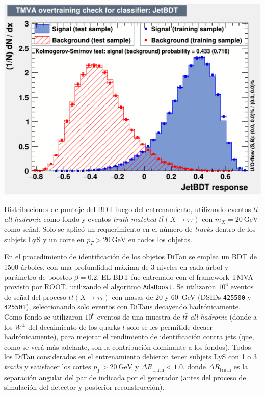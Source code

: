 \begin{marginfigure}[-18em]
    \includegraphics[width=0.99\linewidth]{Assets/Plots/DiTau/ID/TMVA.png}
    \caption{Distribuciones de puntaje del BDT luego del entrenamiento, utilizando eventos $t\bar{t}$ \textit{all-hadronic} como fondo y eventos \textit{truth-matched} $t\bar{t}(X \to \tau\tau)$ con $m_X = \SI{20}{\GeV}$ como señal. Solo se aplicó un requerimiento en el número de \textit{tracks} dentro de los subjets LyS y un corte en $p_T > \SI{20}{\GeV}$ en todos los objetos.}
    \label{fig:ch3:ditau:bdt_output}
\end{marginfigure}

En el procedimiento de identificación de los objetos DiTau se emplea un BDT de 1500 árboles, con una profundidad máxima de 3 niveles en cada árbol y parámetro de boosteo $\beta = 0.2$. EL BDT fue entrenado con el framework TMVA~\cite{hoecker2009tmva} provisto por ROOT, utilizando el algoritmo \texttt{AdaBoost}. Se utilizaron $10^6$ eventos de señal del proceso $t\bar{t}(X\to\tau\tau)$ con masas de \num{20} y \SI{60}{\GeV} (DSIDs \texttt{425500} y \texttt{425501}), seleccionando solo eventos con DiTaus decayendo hadrónicamente. Como fondo se utilizaron $10^6$ eventos de una muestra de $t\bar{t}$ \textit{all-hadronic} (donde a los $W^\pm$ del decaimiento de los quarks $t$ solo se les permitide decaer hadrónicamente), para mejorar el rendimiento de identificación contra jets (que, como se verá más adelante, son la contribución dominante a los fondos). Todos los DiTau considerados en el entrenamiento debieron tener subjets LyS con 1 o 3 \textit{tracks} y satisfacer los cortes $p_T > \SI{20}{\GeV}$ y $\Delta R_{\text{truth}} < 1.0$, donde $\Delta R_{\text{truth}}$ es la separación angular del par de \ttaus indicada por el generador (antes del proceso de simulación del detector y posterior reconstrucción).

